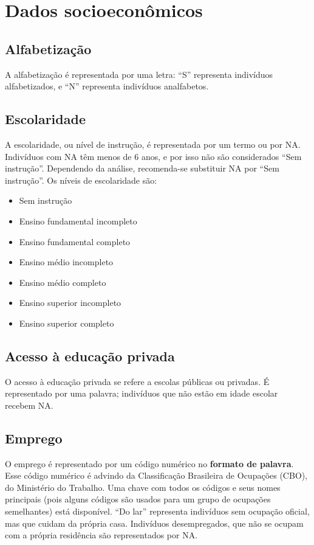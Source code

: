 \documentclass{book}
\begin{document}
\section{Dados socioeconômicos}

\subsection{Alfabetização}
A alfabetização é representada por uma letra: ``S'' representa indivíduos alfabetizados, e ``N'' representa indivíduos analfabetos.

\subsection{Escolaridade}
A escolaridade, ou nível de instrução, é representada por um termo ou por NA. Indivíduos com NA têm menos de 6 anos, e por isso não são considerados ``Sem instrução''. Dependendo da análise, recomenda-se substituir NA por ``Sem instrução''. Os níveis de escolaridade são:
\begin{itemize}
  \item Sem instrução
  \item Ensino fundamental incompleto
  \item Ensino fundamental completo
  \item Ensino médio incompleto
  \item Ensino médio completo
  \item Ensino superior incompleto
  \item Ensino superior completo
\end{itemize}

\subsection{Acesso à educação privada}
O acesso à educação privada se refere a escolas públicas ou privadas. É representado por uma palavra; indivíduos que não estão em idade escolar recebem NA.

\subsection{Emprego}
O emprego é representado por um código numérico no \textbf{formato de palavra}. Esse código numérico é advindo da Classificação Brasileira de Ocupações (CBO), do Ministério do Trabalho. Uma chave com todos os códigos e seus nomes principais (pois alguns códigos são usados para um grupo de ocupações semelhantes) está disponível. ``Do lar'' representa indivíduos sem ocupação oficial, mas que cuidam da própria casa. Indivíduos desempregados, que não se ocupam com a própria residência são representados por NA.
\end{document}
